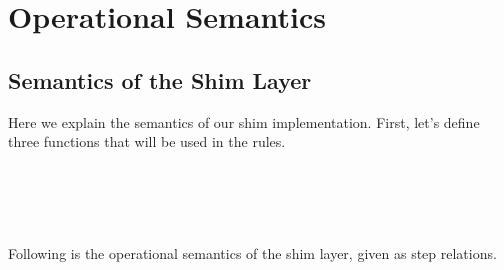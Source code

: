 \section{Operational Semantics}
\subsection {Semantics of the Shim Layer}
Here we explain the semantics of our shim implementation. First, let's define three functions that will be used in the rules. 


\hrulefill \\ \\ \\ \\
Following is the operational semantics of the shim layer, given as step relations. 

